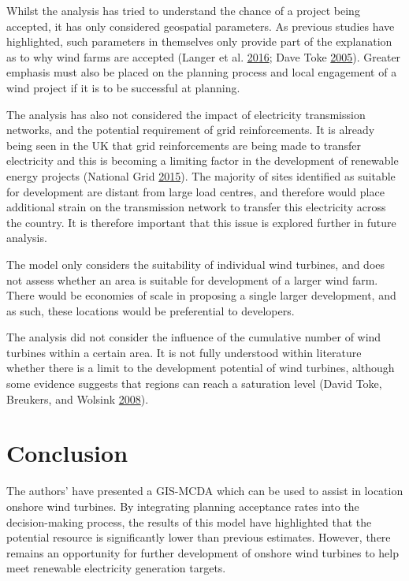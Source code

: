 \documentclass[a4paper,]{article}
\theoremstyle{definition}
\theoremstyle{definition}
\theoremstyle{remark}
\begin{document}
{Whilst the analysis has tried to understand the chance of a project
being accepted, it has only considered geospatial parameters. As
previous studies have highlighted, such parameters in themselves only
provide part of the explanation as to why wind farms are accepted
(Langer et al. \protect\hyperlink{ref-Langer2016a}{2016}; Dave Toke
\protect\hyperlink{ref-Toke2005}{2005}). Greater emphasis must also be
placed on the planning process and local engagement of a wind project if
it is to be successful at planning.

The analysis has also not considered the impact of electricity
transmission networks, and the potential requirement of grid
reinforcements. It is already being seen in the UK that grid
reinforcements are being made to transfer electricity and this is
becoming a limiting factor in the development of renewable energy
projects (National Grid \protect\hyperlink{ref-NationalGrid2015}{2015}).
The majority of sites identified as suitable for development are distant
from large load centres, and therefore would place additional strain on
the transmission network to transfer this electricity across the
country. It is therefore important that this issue is explored further
in future analysis.

The model only considers the suitability of individual wind turbines,
and does not assess whether an area is suitable for development of a
larger wind farm. There would be economies of scale in proposing a
single larger development, and as such, these locations would be
preferential to developers.

The analysis did not consider the influence of the cumulative number of
wind turbines within a certain area. It is not fully understood within
literature whether there is a limit to the development potential of wind
turbines, although some evidence suggests that regions can reach a
saturation level (David Toke, Breukers, and Wolsink
\protect\hyperlink{ref-Toke2008}{2008}).

\section{Conclusion}\label{conclusion}

The authors' have presented a GIS-MCDA which can be used to assist in
location onshore wind turbines. By integrating planning acceptance rates
into the decision-making process, the results of this model have
highlighted that the potential resource is significantly lower than
previous estimates. However, there remains an opportunity for further
development of onshore wind turbines to help meet renewable electricity
generation targets.

}
\end{document}
